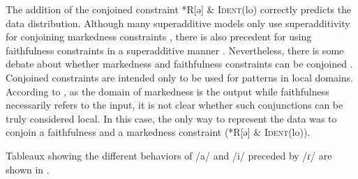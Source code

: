 \documentclass[output=paper,newtxmath,modfonts,nonflat,draftmode]{langsci/langscibook}
\begin{document}
The addition of the conjoined constraint *R[ə] \& \textsc{Ident}(lo) correctly predicts the data distribution. Although many superadditive models only use superadditivity for conjoining markedness constraints \citep{AlbrightMagri2008}, there is also precedent for using faithfulness constraints in a superadditive manner \citep{GreenDavis2014}. Nevertheless, there is some debate about whether markedness and faithfulness constraints can be conjoined \citep{MoretonSmolensky2002}. Conjoined constraints are intended only to be used for patterns in local domains. According to \citet{MoretonSmolensky2002}, as the domain of markedness is the output while faithfulness necessarily refers to the input, it is not clear whether such conjunctions can be truly considered local. In this case, the only way to represent the data was to conjoin a faithfulness and a markedness constraint (*R[ə] \& \textsc{Ident}(lo)). 

Tableaux showing the different behaviors of /a/ and /i/ preceded by /ɾ/ are shown in .

\begin{table}
\small
\caption{Tableau for /Ri\#C/ with sample phrase ‘hair covers’, $n=192$}
\label{tab:baird:5}
\end{table}
\end{document}
